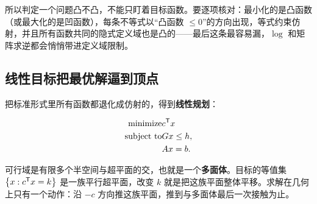 所以判定一个问题凸不凸，不能只盯着目标函数。要逐项核对：最小化的是凸函数（或最大化的是凹函数），每条不等式以``凸函数 \(\le0\)''的方向出现，等式约束仿射，并且所有函数共同的隐式定义域也是凸的——最后这条最容易漏，\(\log\) 和矩阵求逆都会悄悄带进定义域限制。

\subsection{线性目标把最优解逼到顶点}

把标准形式里所有函数都退化成仿射的，得到\textbf{线性规划}：

\[
\begin{aligned}
\text{minimize}\space &c^{\mathsf{T}}x\\
\text{subject to}\space
&Gx\le h,\\
&Ax=b.
\end{aligned}
\]

可行域是有限多个半空间与超平面的交，也就是一个\textbf{多面体}。目标的等值集 \(\left\{x:c^{\mathsf{T}}x=k\right\}\) 是一族平行超平面，改变 \(k\) 就是把这族平面整体平移。求解在几何上只有一个动作：沿 \(-c\) 方向推这族平面，推到与多面体最后一次接触为止。


